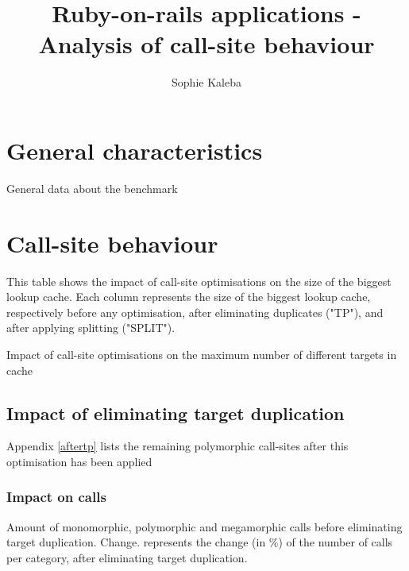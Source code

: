 \documentclass[preprint]{acmart}
\begin{document}
\title{Ruby-on-rails applications - Analysis of call-site behaviour}

\author{Sophie Kaleba}

\maketitle


\section{General characteristics}

\begin{table}[h!]
	\centering
	\resizebox{\linewidth}{!}{
	\GeneralMetrics
	}
	\caption{General data about the benchmark}
\end{table}

\section{Call-site behaviour}

This table shows the impact of call-site optimisations on the size of the biggest lookup cache.
Each column represents the size of the biggest lookup cache, respectively before any optimisation, after eliminating duplicates ("TP"), and after applying splitting ("SPLIT").

\begin{table}[h!]
	\centering
	\Extent
	\caption{Impact of call-site optimisations on the maximum number of different targets in cache}
\end{table}

\subsection{Impact of eliminating target duplication}

Appendix \ref{aftertp} lists the remaining polymorphic call-sites after this optimisation has been applied

\subsubsection{\textbf{Impact on calls}}

Amount of monomorphic, polymorphic and megamorphic calls before eliminating target duplication.
Change. represents the change (in \%) of the number of calls per category, after eliminating target duplication.
\end{document}
